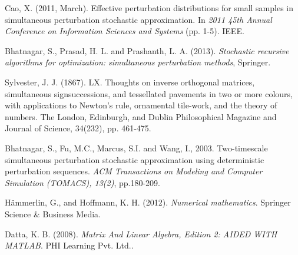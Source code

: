 \documentclass[conference,10.3cpt]{IEEEtran}
\begin{document}
\begin{thebibliography}{1}
Cao, X. (2011, March). Effective perturbation distributions for small samples in simultaneous perturbation stochastic approximation. In \textit{2011 45th Annual Conference on Information Sciences and Systems} (pp. 1-5). IEEE.


 Bhatnagar, S., Prasad,
  H. L. and Prashanth, L. A. (2013). \textit{Stochastic recursive
    algorithms for optimization: simultaneous perturbation methods},
  Springer.

 Sylvester,
  J. J. (1867). LX. Thoughts on inverse orthogonal matrices,
  simultaneous signsuccessions, and tessellated pavements in two or more
  colours, with applications to Newton's rule, ornamental tile-work, and
  the theory of numbers. The London, Edinburgh, and Dublin Philosophical
  Magazine and Journal of Science, 34(232), pp. 461-475.

Bhatnagar, S., Fu, M.C., Marcus, S.I. and Wang, I., 2003. Two-timescale simultaneous perturbation stochastic approximation using deterministic perturbation sequences. \textit{ACM Transactions on Modeling and Computer Simulation (TOMACS), 13(2)}, pp.180-209.

Hämmerlin, G., and Hoffmann, K. H. (2012). \textit{Numerical mathematics}. Springer Science \& Business Media.

Datta, K. B. (2008). \textit{Matrix And Linear Algebra, Edition 2: AIDED WITH MATLAB}. PHI Learning Pvt. Ltd..

\end{thebibliography}
\end{document}
